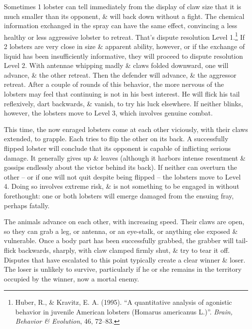 \documentclass[oneside]{book}
\numberwithin{equation}{section}
\begin{document}
Sometimes 1 lobster can tell immediately from the display of claw size that it is much smaller than its opponent, \& will back down without a fight. The chemical information exchanged in the spray can have the same effect, convincing a less healthy or less aggressive lobster to retreat. That's dispute resolution Level 1.\footnote{Huber, R., \& Kravitz, E. A. (1995). ``A quantitative analysis of agonistic behavior in juvenile American lobsters (Homarus americanus L.)''. \textit{Brain, Behavior \& Evolution}, 46, 72--83.} If 2 lobsters are very close in size \& apparent ability, however, or if the exchange of liquid has been insufficiently informative, they will proceed to dispute resolution Level 2. With antennae whipping madly \& claws folded downward, one will advance, \& the other retreat. Then the defender will advance, \& the aggressor retreat. After a couple of rounds of this behavior, the more nervous of the lobsters may feel that continuing is not in his best interest. He will flick his tail reflexively, dart backwards, \& vanish, to try his luck elsewhere. If neither blinks, however, the lobsters move to Level 3, which involves genuine combat.

This time, the now enraged lobsters come at each other viciously, with their claws extended, to grapple. Each tries to flip the other on its back. A successfully flipped lobster will conclude that its opponent is capable of inflicting serious damage. It generally gives up \& leaves (although it harbors intense resentment \& gossips endlessly about the victor behind its back). If neither can overturn the other -- or if one will not quit despite being flipped -- the lobsters move to Level 4. Doing so involves extreme risk, \& is not something to be engaged in without forethought: one or both lobsters will emerge damaged from the ensuing fray, perhaps fatally.

The animals advance on each other, with increasing speed. Their claws are open, so they can grab a leg, or antenna, or an eye-stalk, or anything else exposed \& vulnerable. Once a body part has been successfully grabbed, the grabber will tail-flick backwards, sharply, with claw clamped firmly shut, \& try to tear it off. Disputes that have escalated to this point typically create a clear winner \& loser. The loser is unlikely to survive, particularly if he or she remains in the territory occupied by the winner, now a mortal enemy.
\end{document}
